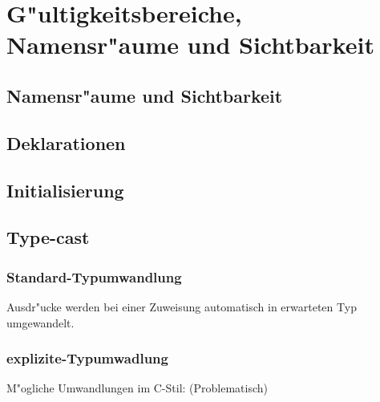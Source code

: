 \section{G"ultigkeitsbereiche, Namensr"aume und Sichtbarkeit}
\subsection{Namensr"aume und Sichtbarkeit}
\subsection{Deklarationen}
\subsection{Initialisierung}
\subsection{Type-cast}
\subsubsection{Standard-Typumwandlung}
Ausdr"ucke werden bei einer Zuweisung automatisch in erwarteten Typ umgewandelt.
 
\subsubsection{explizite-Typumwadlung}
 M"ogliche Umwandlungen im C-Stil: (Problematisch)
 